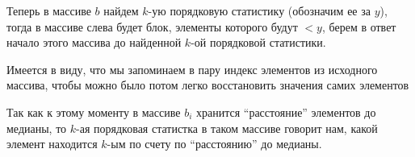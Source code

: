 \begin{solution}
\begin{enumerate}[(a)]
        Теперь в массиве $b$ найдем $k$-ую порядковую статистику (обозначим ее за $y$), тогда в массиве слева будет блок, элементы которого будут $< y$, берем в ответ начало этого массива до найденной $k$-ой порядковой статистики.
        \begin{remark}
            Имеется в виду, что мы запоминаем в пару индекс элементов из исходного массива, чтобы можно было потом легко восстановить значения самих элементов
        \end{remark}
        \begin{remark}
            Так как к этому моменту в массиве $b_i$ хранится ``расстояние'' элементов до медианы, то $k$-ая порядковая статистка в таком массиве говорит нам, какой элемент находится $k$-ым по счету по ``расстоянию'' до медианы.
        \end{remark}
    \end{enumerate}
\end{solution}